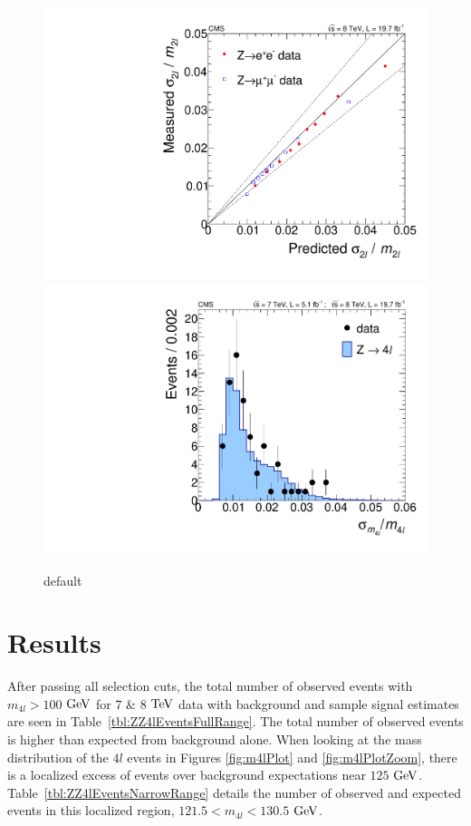 \begin{figure}[htbp]
\begin{center}
\includegraphics[width=.45\linewidth]{HiggsDiscovery/figures/DmassValid_Z2l.pdf}
\includegraphics[width=.45\linewidth]{HiggsDiscovery/figures/Dmass_Z4l.pdf}
\caption[Calibration and Closure Test of Per-Event Mass Errors in $4l$]{default}
\label{fig:PerEventMassErrors}
\end{center}
\end{figure}


\section{Results}
\label{sec:ZZ4lResults}

After passing all selection cuts, the total number of observed events with $m_{4l} > 100$ $\rm{GeV}$ for $7$ $\&$ $8$ $\rm{TeV}$ data with background and sample signal estimates are seen in Table~\ref{tbl:ZZ4lEventsFullRange}. The total number of observed events is higher than expected from background alone. When looking at the mass distribution of the $4l$ events in Figures \ref{fig:m4lPlot} and \ref{fig:m4lPlotZoom}, there is a localized excess of events over background expectations near $125$ $\rm{GeV}$. Table~\ref{tbl:ZZ4lEventsNarrowRange} details the number of observed and expected events in this localized region, $121.5 < m_{4l} < 130.5$ $\rm{GeV}$. 

